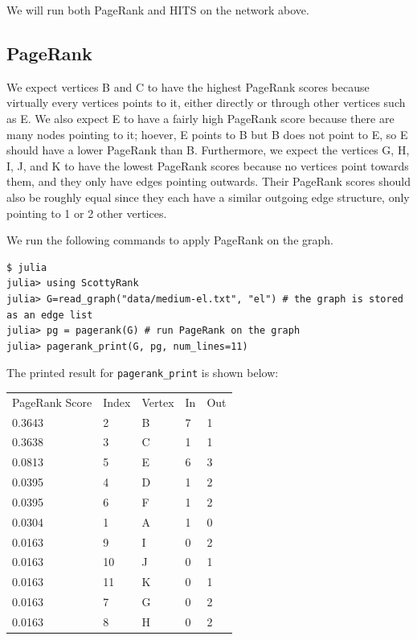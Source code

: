 \documentclass[12pt, titlepage, twoside]{amsart}
\begin{document}
We will run both PageRank and HITS on the network above.

\subsection{PageRank}

We expect vertices B and C to have the highest PageRank scores
because virtually every vertices points to it, either directly or through other vertices such as E.
We also expect E to have a fairly high PageRank score because there are many nodes pointing to it;
hoever, E points to B but B does not point to E, so E should have a lower PageRank than B.
Furthermore, we expect the vertices G, H, I, J, and K to have the lowest PageRank scores because
no vertices point towards them, and they only have edges pointing outwards.
Their PageRank scores should also be roughly equal since they each have a similar outgoing edge structure,
only pointing to 1 or 2 other vertices.

We run the following commands to apply PageRank on the graph.

\begin{verbatim}
$ julia
julia> using ScottyRank
julia> G=read_graph("data/medium-el.txt", "el") # the graph is stored as an edge list
julia> pg = pagerank(G) # run PageRank on the graph
julia> pagerank_print(G, pg, num_lines=11)
\end{verbatim}

The printed result for \texttt{pagerank_print} is shown below:

\begin{table}[h]
\begin{tabular}{lllll}
PageRank Score & Index & Vertex & In & Out\\
    0.3643 &        2 &         B& 7 &         1 \\
    0.3638 &         3 &         C& 1 &         1 \\
    0.0813 &         5 &         E& 6 &         3 \\
    0.0395 &         4 &         D& 1 &         2 \\
    0.0395 &         6 &         F& 1 &         2 \\
    0.0304 &         1 &         A& 1 &         0 \\
    0.0163 &         9 &         I& 0 &         2 \\
    0.0163 &        10 &         J& 0 &         1 \\
    0.0163 &        11 &         K& 0 &         1 \\
    0.0163 &         7 &         G& 0 &         2 \\
    0.0163 &         8 &         H& 0 &          2\\
\end{tabular}
\end{table}
\end{document}
